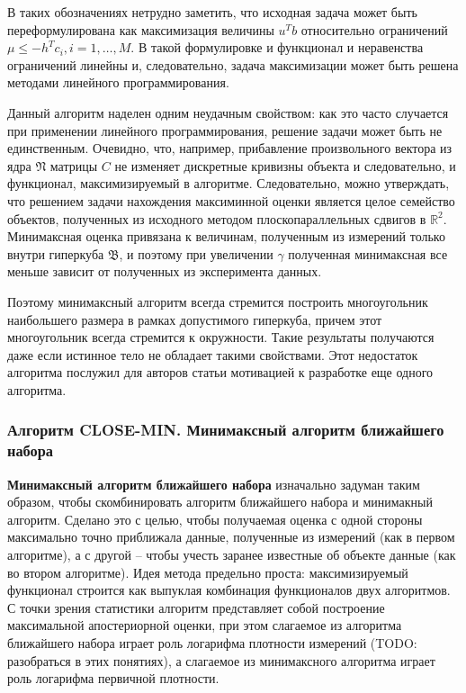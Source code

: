 \documentclass[a4paper, 12pt, titlepage]{article}
\theoremstyle{definition}
\theoremstyle{plain}
\theoremstyle{plain}
\begin{document}
В таких обозначениях нетрудно заметить, что исходная задача может
быть переформулирована как максимизация величины $u^{T} b$ относительно
ограничений $\mu \leq - h^{T} c_{i}, i = 1, \ldots, M$. В такой формулировке и
функционал и неравенства ограничений линейны и, следовательно, задача
максимизации может быть решена методами линейного программирования.

Данный алгоритм наделен одним неудачным свойством: как это часто случается при
применении линейного программирования, решение задачи может быть не
единственным. Очевидно, что, например, прибавление произвольного вектора из ядра
$\mathfrak{N}$ матрицы $C$ не изменяет дискретные кривизны объекта и
следовательно, и функционал, максимизируемый в алгоритме. Следовательно, можно
утверждать, что решением задачи нахождения максиминной оценки является целое
семейство объектов, полученных из исходного методом плоскопараллельных сдвигов в
$\mathbb{R}^{2}$. Минимаксная оценка привязана к величинам, полученным из
измерений только внутри гиперкуба $\mathfrak{B}$, и поэтому при увеличении
$\gamma$ полученная минимаксная все меньше зависит от полученных из эксперимента
данных.

Поэтому минимаксный алгоритм всегда стремится построить многоугольник
наибольшего размера в рамках допустимого гиперкуба, причем этот многоугольник
всегда стремится к окружности. Такие результаты получаются даже если истинное
тело не обладает такими свойствами. Этот недостаток алгоритма послужил для
авторов статьи мотивацией к разработке еще одного алгоритма.

\subsubsection{Алгоритм CLOSE-MIN. Минимаксный алгоритм ближайшего набора}

\textbf{Минимаксный алгоритм ближайшего набора} изначально задуман таким
образом, чтобы скомбинировать алгоритм ближайшего набора и минимакный алгоритм.
Сделано это с целью, чтобы получаемая оценка с одной стороны максимально точно
приближала данные, полученные из измерений (как в первом алгоритме), а с другой
-- чтобы учесть заранее известные об объекте данные (как во втором алгоритме).
Идея метода предельно проста: максимизируемый функционал строится как выпуклая
комбинация функционалов двух алгоритмов. С точки зрения статистики алгоритм
представляет собой построение максимальной апостериорной оценки, при этом
слагаемое из алгоритма ближайшего набора играет роль логарифма плотности
измерений (TODO: разобраться в этих понятиях), а слагаемое из минимаксного
алгоритма играет роль логарифма первичной плотности.
\end{document}
